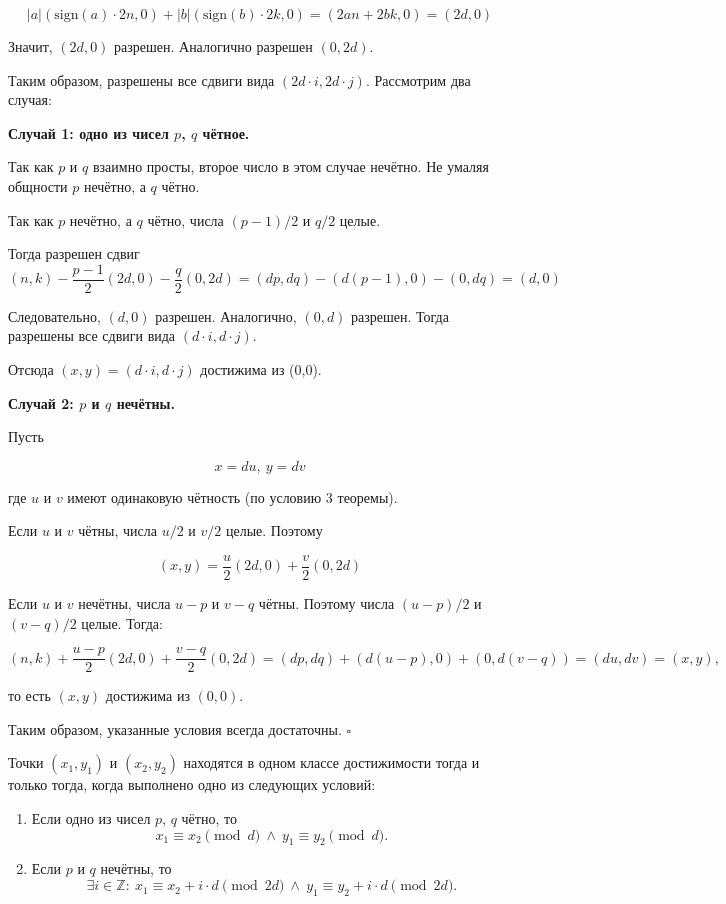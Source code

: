 $$|a|(\text{sign}(a) \cdot 2n,0) + |b|(\text{sign}(b) \cdot 2k,0) = (2an+2bk,0) = (2d,0)$$

Значит, $(2d,0)$ разрешен. Аналогично разрешен $(0,2d)$.
\ms

Таким образом, разрешены все сдвиги вида $(2d \cdot i,2d\cdot j)$. Рассмотрим два случая: 
\ms

\textbf{Случай 1: одно из чисел $p$, $q$ чётное.}
\ms

Так как $p$ и $q$ взаимно просты, второе число в этом случае нечётно. Не умаляя общности $p$ нечётно, а $q$ чётно. 

Так как $p$ нечётно, а $q$ чётно, числа $(p-1)/2$ и $q/2$ целые. 

Тогда разрешен сдвиг $$(n,k) - \frac{p-1}{2}(2d,0) - \frac{q}{2}(0,2d) = (dp,dq) - (d(p-1),0) - (0,dq) = (d,0)$$

Следовательно, $(d,0)$ разрешен. Аналогично, $(0,d)$ разрешен. Тогда разрешены все сдвиги вида $(d \cdot i,d\cdot j)$. 
\ms

Отсюда $(x, y) = (d \cdot i, d\cdot j)$ достижима из (0,0).
\bs

\textbf{Случай 2: $p$ и $q$ нечётны.}

Пусть

$$x = du,\ y = dv$$

где $u$ и $v$ имеют одинаковую чётность (по условию 3 теоремы).

Если $u$ и $v$ чётны, числа $u/2$ и $v/2$ целые. Поэтому

$$(x,y) = \frac{u}{2}(2d,0) + \frac{v}{2}(0,2d)$$

Если $u$ и $v$ нечётны, числа $u-p$ и $v-q$ чётны. Поэтому числа $(u-p)/2$ и $(v-q)/2$ целые. Тогда:

$$(n,k) + \frac{u-p}{2}(2d,0) + \frac{v-q}{2}(0,2d) = (dp,dq) + (d(u-p),0) + (0,d(v-q)) = (du,dv) = (x,y),$$

то есть $(x,y)$ достижима из $(0,0)$.
\bs

Таким образом, указанные условия всегда достаточны. \hfill $\square$
\bigskip

\begin{corollary}
Точки $(x_1,y_1)$ и $(x_2,y_2)$ находятся в одном классе достижимости тогда и только тогда, когда выполнено одно из следующих условий:
\begin{enumerate}
    \item Если одно из чисел $p$, $q$ чётно, то
    $$x_1\equiv x_2\pmod d \ \land\ y_1\equiv y_2\pmod d.$$
    \item Если $p$ и $q$ нечётны, то
    $$\exists i\in\mathbb Z:\ x_1\equiv x_2+i\cdot d\pmod{2d}
    \ \land\ y_1\equiv y_2+i\cdot d\pmod{2d}.$$
\end{enumerate}
\end{corollary}
\bs

